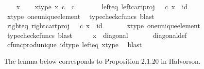 \begin{isabellebody}
\isamarkupfalse%
\isanewline
\ \ \isamarkupfalse%
\ x\isanewline
\ \ \isamarkupfalse%
\ x{\isacharunderscore}{\kern0pt}type{\isacharcolon}{\kern0pt}\ {\isachardoublequoteopen}x\ {\isasymin}\isactrlsub c\ {\isasymone}\ {\isasymtimes}\isactrlsub c\ {\isasymone}{\isachardoublequoteclose}\isanewline
\ \ \isanewline
\ \ \isamarkupfalse%
\ left{\isacharunderscore}{\kern0pt}eq{\isacharcolon}{\kern0pt}\ {\isachardoublequoteopen}left{\isacharunderscore}{\kern0pt}cart{\isacharunderscore}{\kern0pt}proj\ {\isasymone}\ {\isasymone}\ {\isasymcirc}\isactrlsub c\ x\ {\isacharequal}{\kern0pt}\ id\ {\isasymone}{\isachardoublequoteclose}\isanewline
\ \ \ \ \isamarkupfalse%
\ x{\isacharunderscore}{\kern0pt}type\ one{\isacharunderscore}{\kern0pt}unique{\isacharunderscore}{\kern0pt}element\ \isamarkupfalse%
\ {\isacharparenleft}{\kern0pt}typecheck{\isacharunderscore}{\kern0pt}cfuncs{\isacharcomma}{\kern0pt}\ blast{\isacharparenright}{\kern0pt}\isanewline
\ \ \isamarkupfalse%
\ right{\isacharunderscore}{\kern0pt}eq{\isacharcolon}{\kern0pt}\ {\isachardoublequoteopen}right{\isacharunderscore}{\kern0pt}cart{\isacharunderscore}{\kern0pt}proj\ {\isasymone}\ {\isasymone}\ {\isasymcirc}\isactrlsub c\ x\ {\isacharequal}{\kern0pt}\ id\ {\isasymone}{\isachardoublequoteclose}\isanewline
\ \ \ \ \isamarkupfalse%
\ x{\isacharunderscore}{\kern0pt}type\ one{\isacharunderscore}{\kern0pt}unique{\isacharunderscore}{\kern0pt}element\ \isamarkupfalse%
\ {\isacharparenleft}{\kern0pt}typecheck{\isacharunderscore}{\kern0pt}cfuncs{\isacharcomma}{\kern0pt}\ blast{\isacharparenright}{\kern0pt}\isanewline
\isanewline
\ \ \isamarkupfalse%
\ \isamarkupfalse%
\ {\isachardoublequoteopen}x\ {\isacharequal}{\kern0pt}\ diagonal\ {\isasymone}{\isachardoublequoteclose}\isanewline
\ \ \ \ \isamarkupfalse%
\ diagonal{\isacharunderscore}{\kern0pt}def\ \isamarkupfalse%
\ cfunc{\isacharunderscore}{\kern0pt}prod{\isacharunderscore}{\kern0pt}unique\ id{\isacharunderscore}{\kern0pt}type\ left{\isacharunderscore}{\kern0pt}eq\ x{\isacharunderscore}{\kern0pt}type\ \isamarkupfalse%
\ blast\isanewline
{}\isamarkupfalse%
%
\endisatagproof
{\isafoldproof}%
%
\isadelimproof
%
\endisadelimproof
%
\begin{isamarkuptext}%
The lemma below corresponds to Proposition 2.1.20 in Halvorson.%
\end{isamarkuptext}\isamarkuptrue%

\end{isabellebody}
